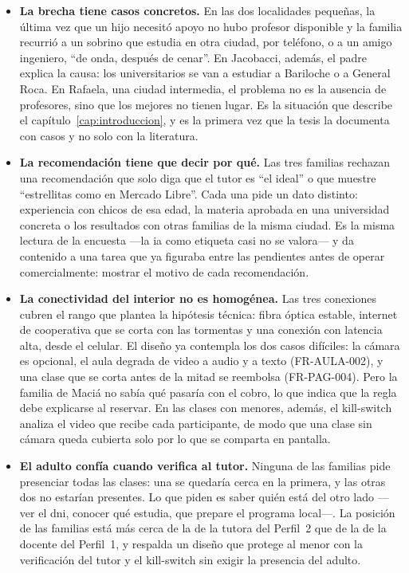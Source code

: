 \begin{itemize}
    \item \textbf{La brecha tiene casos concretos.} En las dos
          localidades pequeñas, la última vez que un hijo necesitó apoyo
          no hubo profesor disponible y la familia recurrió a un sobrino
          que estudia en otra ciudad, por teléfono, o a un amigo ingeniero,
          ``de onda, después de cenar''. En Jacobacci, además, el padre
          explica la causa: los universitarios se van a estudiar a
          Bariloche o a General Roca. En Rafaela, una ciudad intermedia, el
          problema no es la ausencia de profesores, sino que los mejores
          no tienen lugar. Es la situación que describe el
          capítulo~\ref{cap:introduccion}, y es la primera vez que la tesis
          la documenta con casos y no solo con la literatura.
    \item \textbf{La recomendación tiene que decir por qué.} Las tres
          familias rechazan una recomendación que solo diga que el tutor es
          ``el ideal'' o que muestre ``estrellitas como en Mercado Libre''.
          Cada una pide un dato distinto: experiencia con chicos de esa
          edad, la materia aprobada en una universidad concreta o los
          resultados con otras familias de la misma ciudad. Es la misma
          lectura de la encuesta ---la \gls{ia} como etiqueta casi no se
          valora--- y da contenido a una tarea que ya figuraba entre las
          pendientes antes de operar comercialmente: mostrar el motivo de
          cada recomendación.
    \item \textbf{La conectividad del interior no es homogénea.} Las tres
          conexiones cubren el rango que plantea la hipótesis técnica:
          fibra óptica estable, internet de cooperativa que se corta con
          las tormentas y una conexión con latencia alta, desde el celular.
          El diseño ya contempla los dos casos difíciles: la cámara es
          opcional, el aula degrada de video a audio y a texto
          (FR-AULA-002), y una clase que se corta antes de la mitad se
          reembolsa (FR-PAG-004). Pero la familia de Maciá no sabía qué
          pasaría con el cobro, lo que indica que la regla debe explicarse
          al reservar. En las clases con menores, además, el kill-switch
          analiza el video que recibe cada participante, de modo que una
          clase sin cámara queda cubierta solo por lo que se comparta en
          pantalla.
    \item \textbf{El adulto confía cuando verifica al tutor.} Ninguna de
          las familias pide presenciar todas las clases: una se quedaría
          cerca en la primera, y las otras dos no estarían presentes. Lo que
          piden es saber quién está del otro lado ---ver el \gls{dni},
          conocer qué estudia, que prepare el programa local---. La
          posición de las familias está más cerca de la de la tutora del
          Perfil~2 que de la de la docente del Perfil~1, y respalda un
          diseño que protege al menor con la verificación del tutor y el
          kill-switch sin exigir la presencia del adulto.
\end{itemize}

